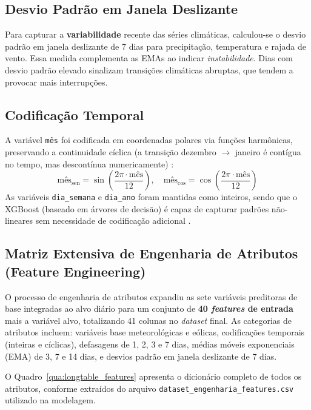 \subsection{Desvio Padrão em Janela Deslizante}
Para capturar a \textbf{variabilidade} recente das séries climáticas, calculou-se o desvio padrão em janela deslizante de 7 dias para precipitação, temperatura e rajada de vento. Essa medida complementa as EMAs ao indicar \textit{instabilidade}. Dias com desvio padrão elevado sinalizam transições climáticas abruptas, que tendem a provocar mais interrupções.

\subsection{Codificação Temporal}
A variável \texttt{mês} foi codificada em coordenadas polares via funções harmônicas, preservando a continuidade cíclica (a transição dezembro $\rightarrow$ janeiro é contígua no tempo, mas descontínua numericamente) \cite{goodfellow2016deep}:
\begin{equation}
    \text{mês}_{\mathrm{sen}} = \sin\left(\frac{2\pi \cdot \text{mês}}{12}\right), \quad
    \text{mês}_{\mathrm{cos}} = \cos\left(\frac{2\pi \cdot \text{mês}}{12}\right)
\end{equation}
As variáveis \texttt{dia\_semana} e \texttt{dia\_ano} foram mantidas como inteiros, sendo que o XGBoost (baseado em árvores de decisão) é capaz de capturar padrões não-lineares sem necessidade de codificação adicional \cite{chen2016xgboost}.

\subsection{Matriz Extensiva de Engenharia de Atributos (Feature Engineering)}
O processo de engenharia de atributos expandiu as sete variáveis preditoras de base integradas ao alvo diário para um conjunto de \textbf{40 \textit{features} de entrada} mais a variável alvo, totalizando 41 colunas no \textit{dataset} final. As categorias de atributos incluem: variáveis base meteorológicas e eólicas, codificações temporais (inteiras e cíclicas), defasagens de 1, 2, 3 e 7 dias, médias móveis exponenciais (EMA) de 3, 7 e 14 dias, e desvios padrão em janela deslizante de 7 dias.

O Quadro~\ref{qua:longtable_features} apresenta o dicionário completo de todos os atributos, conforme extraídos do arquivo \texttt{dataset\_engenharia\_features.csv} utilizado na modelagem.


